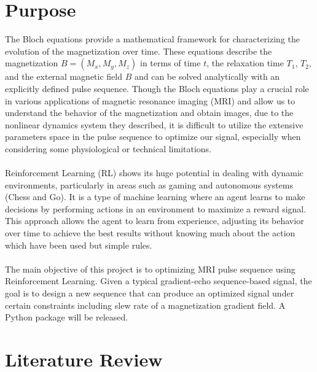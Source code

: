 \section{Purpose}
The Bloch equations provide a mathematical framework for characterizing the evolution of the magnetization over time. These equations describe the magnetization $B=(M_x, M_y, M_z)$ in terms of time $t$, the relaxation time $T_1$, $T_2$, and the external magnetic field $B$ and can be solved analytically with an explicitly defined pulse sequence. Though the Bloch equations play a crucial role in various applications of magnetic resonance imaging (MRI) and allow us to understand the behavior of the magnetization and obtain images, due to the nonlinear dynamics system they described, it is difficult to utilize the extensive parameters space in the pulse sequence to optimize our signal, especially when considering some physiological or technical limitations.
\\\\
Reinforcement Learning (RL) shows its huge potential in dealing with dynamic environments, particularly in areas such as gaming and autonomous systems (Chess and Go). It is a type of machine learning where an agent learns to make decisions by performing actions in an environment to maximize a reward signal. This approach allows the agent to learn from experience, adjusting its behavior over time to achieve the best results without knowing much about the action which have been used but simple rules.
\\\\
The main objective of this project is to optimizing MRI pulse sequence using Reinforcement Learning. Given a typical gradient-echo sequence-based signal, the goal is to design a new sequence that can produce an optimized signal under certain constraints including slew rate of a magnetization gradient field. A Python package will be released.

\section{Literature Review}

